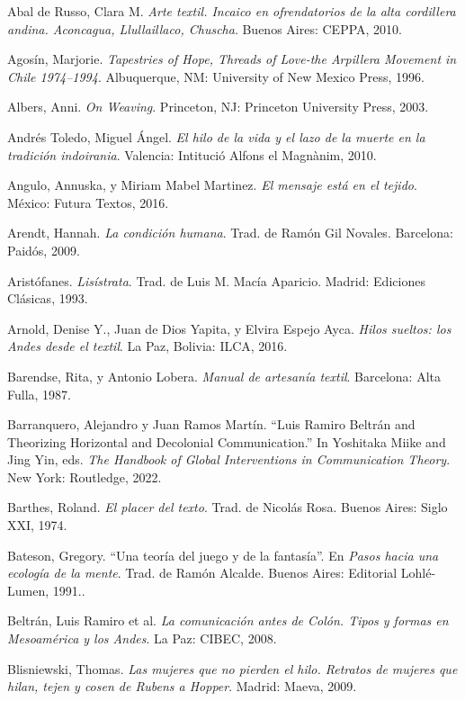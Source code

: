 \documentclass{tufte-handout}
\begin{document}
\begin{hangparas}{.25in}{1} 



Abal de Russo, Clara M. \emph{Arte textil. Incaico en ofrendatorios de
la alta cordillera andina. Aconcagua, Llullaillaco, Chuscha}. Buenos
Aires: CEPPA, 2010.

Agosín, Marjorie. \emph{Tapestries of Hope, Threads of Love-the
Arpillera Movement in Chile 1974--1994}. Albuquerque, NM: University of
New Mexico Press, 1996.

Albers, Anni. \emph{On Weaving}. Princeton, NJ: Princeton University
Press, 2003.

Andrés Toledo, Miguel Ángel. \emph{El hilo de la vida y el lazo de la
muerte en la tradición indoirania}. Valencia: Intitució Alfons el
Magnànim, 2010.

Angulo, Annuska, y Miriam Mabel Martinez. \emph{El mensaje está en el
tejido}. México: Futura Textos, 2016.

Arendt, Hannah. \emph{La condición humana}. Trad. de Ramón Gil Novales.
Barcelona: Paidós, 2009.

Aristófanes. \emph{Lisístrata}. Trad. de Luis M. Macía Aparicio. Madrid:
Ediciones Clásicas, 1993.

Arnold, Denise Y., Juan de Dios Yapita, y Elvira Espejo Ayca.
\emph{Hilos sueltos: los Andes desde el textil}. La Paz, Bolivia: ILCA,
2016.

Barendse, Rita, y Antonio Lobera. \emph{Manual de artesanía textil}.
Barcelona: Alta Fulla, 1987.

Barranquero, Alejandro y Juan Ramos Martín. ``Luis Ramiro Beltrán and
Theorizing Horizontal and Decolonial Communication.'' In Yoshitaka Miike
and Jing Yin, eds. \emph{The Handbook of Global Interventions in
Communication Theory}. New York: Routledge, 2022.

Barthes, Roland. \emph{El placer del texto}. Trad. de Nicolás Rosa.
Buenos Aires: Siglo XXI, 1974.

Bateson, Gregory. ``Una teoría del juego y de la fantasía''. En
\emph{Pasos hacia una ecología de la mente}. Trad. de Ramón Alcalde.
Buenos Aires: Editorial Lohlé-Lumen, 1991..

Beltrán, Luis Ramiro et al. \emph{La comunicación antes de Colón. Tipos
y formas en Mesoamérica y los Andes}. La Paz: CIBEC, 2008.

Blisniewski, Thomas. \emph{Las mujeres que no pierden el hilo. Retratos
de mujeres que hilan, tejen y cosen de Rubens a Hopper}. Madrid: Maeva,
2009.


\end{hangparas}
\end{document}
